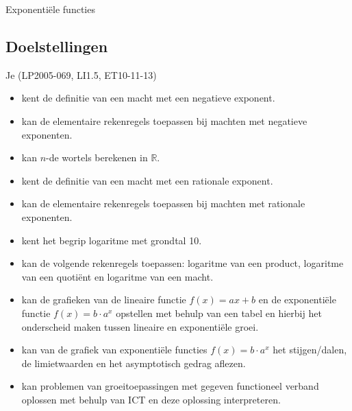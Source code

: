 \documentclass[12pt,twoside]{article}
\begin{document}
\thispagestyle{empty}
\begin{center}
  \begin{mdframed}
  \centering
  \fontsize{40}{60}\selectfont Exponentiële functies
  \end{mdframed}
  \vfill
{}
  \vfill
\end{center}

\subsection*{Doelstellingen}
\vspace*{-0.8cm}
{\singlespacing
Je \hfill  {\scriptsize(LP2005-069, LI1.5, ET10-11-13)}
\begin{itemize}
  \itemsep-0.2em
  \item kent de definitie van een macht met een negatieve exponent.
  \item kan de elementaire rekenregels toepassen bij machten met negatieve exponenten.
  \item kan $n$-de wortels berekenen in $\mathbb{R}$.
  \item kent de definitie van een macht met een rationale exponent.
  \item kan de elementaire rekenregels toepassen bij machten met rationale exponenten.
  \item kent het begrip logaritme met grondtal 10.
  \item kan de volgende rekenregels toepassen: logaritme van een product, logaritme van een quotiënt en logaritme van een macht.
  \item kan de grafieken van de lineaire functie $f(x) = ax + b$ en de exponentiële functie $f(x) = b\cdot a^x$ opstellen met behulp van een tabel en hierbij het onderscheid maken tussen lineaire en exponentiële groei.
  \item kan van de grafiek van exponentiële functies $f(x)=b\cdot a^x$ het stijgen/dalen, de limietwaarden en
het asymptotisch gedrag aflezen.
  \item kan problemen van groeitoepassingen met gegeven functioneel verband oplossen met behulp van ICT en deze oplossing interpreteren.
\end{itemize}}
\end{document}
